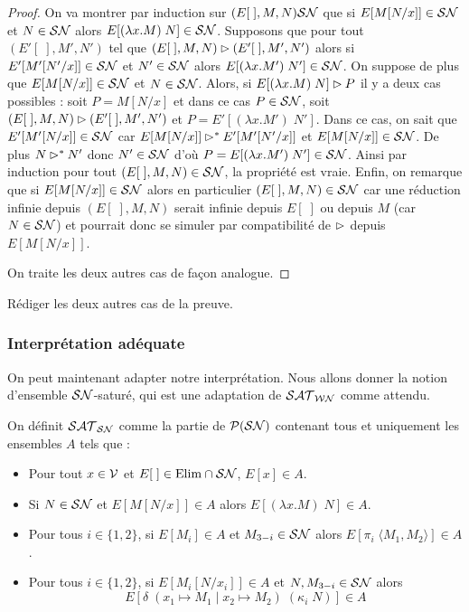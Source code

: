 \begin{proof}
    On va montrer par induction sur $(E[\;],M,N)\mathcal {SN}$ que si $E[M[N/x]]\in\mathcal {SN}$ et $N\in\mathcal {SN}$ alors $E[(\lambda x.M)\;N]\in\mathcal {SN}$. Supposons que pour tout $(E'[\;],M',N')$ tel que $(E[\;],M,N)\rhd (E'[\;],M',N')$ alors si $E'[M'[N'/x]]\in\mathcal {SN}$ et $N'\in\mathcal {SN}$ alors $E[(\lambda x.M')\;N']\in\mathcal {SN}$. On suppose de plus que $E[M[N/x]]\in\mathcal {SN}$ et $N\in\mathcal {SN}$. Alors, si $E[(\lambda x.M)\;N]\rhd P$ il y a deux cas possibles : soit $P = M[N/x]$ et dans ce cas $P\in\mathcal {SN}$, soit $(E[\;],M,N)\rhd (E'[\;],M',N')$ et $P = E'[(\lambda x.M')\;N']$. Dans ce cas, on sait que $E'[M'[N/x]]\in\mathcal {SN}$ car $E[M[N/x]]\rhd^* E'[M'[N'/x]]$ et $E[M[N/x]]\in\mathcal {SN}$. De plus $N\rhd^* N'$ donc $N'\in\mathcal {SN}$ d'où $P = E[(\lambda x.M')\;N']\in\mathcal {SN}$. Ainsi par induction pour tout $(E[\;],M,N)\in\mathcal {SN}$, la propriété est vraie. Enfin, on remarque que si $E[M[N/x]]\in\mathcal {SN}$ alors en particulier $(E[\;],M,N)\in\mathcal {SN}$ car une réduction infinie depuis $(E[\;],M,N)$ serait infinie depuis $E[\;]$ ou depuis $M$ (car $N\in\mathcal {SN}$) et pourrait donc se simuler par compatibilité de $\rhd$ depuis $E[M[N/x]]$.

    On traite les deux autres cas de façon analogue.
\end{proof}

\begin{exo}
    Rédiger les deux autres cas de la preuve.
\end{exo}

\subsubsection{Interprétation adéquate}

On peut maintenant adapter notre interprétation. Nous allons donner la notion d'ensemble $\mathcal {SN}$-saturé, qui est une adaptation de $\mathcal {SAT}_{\mathcal{WN}}$ comme attendu.

\begin{defi}
    On définit $\mathcal {SAT}_{\mathcal{SN}}$ comme la partie de $\mathcal P(\mathcal {SN})$ contenant tous et uniquement les ensembles $A$ tels que :
    \begin{itemize}[label=$\bullet$]
        \item Pour tout $x\in\mathcal V$ et $E[\;]\in\mathrm{Elim}\cap\mathcal {SN}$, $E[x]\in A$.
        \item Si $N\in\mathcal {SN}$ et $E[M[N/x]]\in A$ alors $E[(\lambda x.M)\;N]\in A$.
        \item Pour tous $i\in\{1,2\}$, si $E[M_i]\in A$ et $M_{3-i}\in \mathcal {SN}$ alors $E[\pi_i\;\langle M_1,M_2\rangle]\in A$.
        \item Pour tous $i\in\{1,2\}$, si $E[M_i[N/x_i]]\in A$ et $N,M_{3-i}\in\mathcal {SN}$ alors $$E[\delta\;(x_1\mapsto M_1\mid x_2\mapsto M_2)\;(\kappa_i\;N)]\in A$$
    \end{itemize}
\end{defi}

